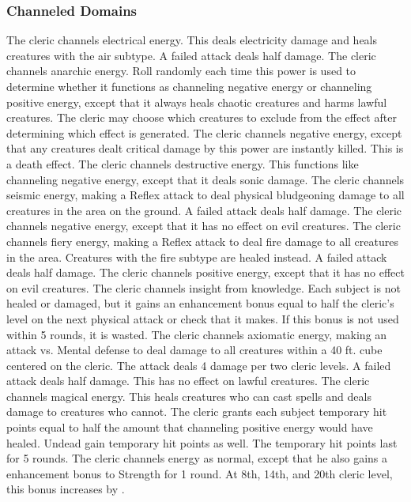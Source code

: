 \subsubsection{Channeled Domains}\label{Channeled Domains}

The cleric channels electrical energy.
This deals electricity damage and heals creatures with the air subtype.
A failed attack deals half damage.
The cleric channels anarchic energy.
Roll randomly each time this power is used to determine whether it functions as channeling negative energy or channeling positive energy, except that it always heals chaotic creatures and harms lawful creatures.
The cleric may choose which creatures to exclude from the effect after determining which effect is generated.
The cleric channels negative energy, except that any creatures dealt critical damage by this power are instantly killed.
This is a death effect.
The cleric channels destructive energy.
This functions like channeling negative energy, except that it deals sonic damage.
The cleric channels seismic energy, making a Reflex attack to deal physical bludgeoning damage to all creatures in the area on the ground.
A failed attack deals half damage.
The cleric channels negative energy, except that it has no effect on evil creatures.
The cleric channels fiery energy, making a Reflex attack to deal fire damage to all creatures in the area.
Creatures with the fire subtype are healed instead.
A failed attack deals half damage.
The cleric channels positive energy, except that it has no effect on evil creatures.
The cleric channels insight from knowledge.
Each subject is not healed or damaged, but it gains an enhancement bonus equal to half the cleric's level on the next physical attack or check that it makes.
If this bonus is not used within 5 rounds, it is wasted.
The cleric channels axiomatic energy, making an attack vs. Mental defense to deal damage to all creatures within a 40 ft.
cube centered on the cleric.
The attack deals 4 damage per two cleric levels.
A failed attack deals half damage.
This has no effect on lawful creatures.
The cleric channels magical energy.
This heals creatures who can cast spells and deals damage to creatures who cannot.
The cleric grants each subject temporary hit points equal to half the amount that channeling positive energy would have healed.
Undead gain temporary hit points as well.
The temporary hit points last for 5 rounds.
The cleric channels energy as normal, except that he also gains a  enhancement bonus to Strength for 1 round.
At 8th, 14th, and 20th cleric level, this bonus increases by .

